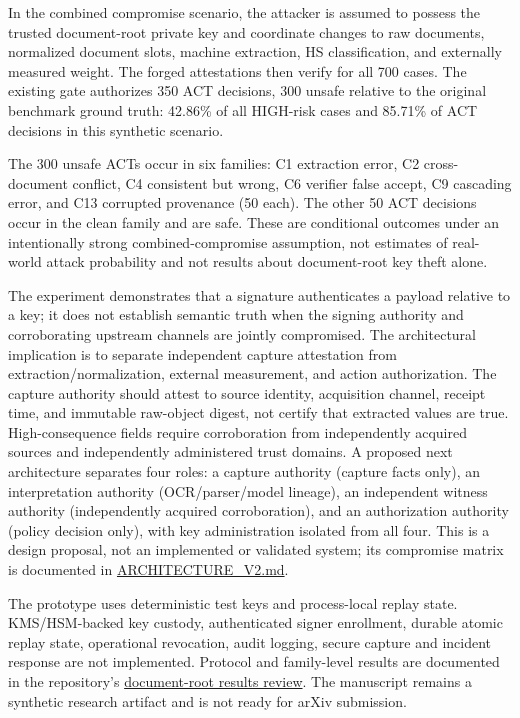 \documentclass[11pt]{article}
\begin{document}
In the combined compromise scenario, the attacker is assumed to possess the trusted document-root private key and coordinate changes to raw documents, normalized document slots, machine extraction, HS classification, and externally measured weight. The forged attestations then verify for all 700 cases. The existing gate authorizes 350 ACT decisions, 300 unsafe relative to the original benchmark ground truth: 42.86\% of all HIGH-risk cases and 85.71\% of ACT decisions in this synthetic scenario.

The 300 unsafe ACTs occur in six families: C1 extraction error, C2 cross-document conflict, C4 consistent but wrong, C6 verifier false accept, C9 cascading error, and C13 corrupted provenance (50 each). The other 50 ACT decisions occur in the clean family and are safe. These are conditional outcomes under an intentionally strong combined-compromise assumption, not estimates of real-world attack probability and not results about document-root key theft alone.

The experiment demonstrates that a signature authenticates a payload relative to a key; it does not establish semantic truth when the signing authority and corroborating upstream channels are jointly compromised. The architectural implication is to separate independent capture attestation from extraction/normalization, external measurement, and action authorization. The capture authority should attest to source identity, acquisition channel, receipt time, and immutable raw-object digest, not certify that extracted values are true. High-consequence fields require corroboration from independently acquired sources and independently administered trust domains. A proposed next architecture separates four roles: a capture authority (capture facts only), an interpretation authority (OCR/parser/model lineage), an independent witness authority (independently acquired corroboration), and an authorization authority (policy decision only), with key administration isolated from all four. This is a design proposal, not an implemented or validated system; its compromise matrix is documented in \href{https://github.com/Hafiz-IIT/EXIM-AI-Evidence-Gated-Autonomy/blob/main/experiments/document_root_attestation/ARCHITECTURE_V2.md}{ARCHITECTURE\_V2.md}.

The prototype uses deterministic test keys and process-local replay state. KMS/HSM-backed key custody, authenticated signer enrollment, durable atomic replay state, operational revocation, audit logging, secure capture and incident response are not implemented. Protocol and family-level results are documented in the repository's \href{https://github.com/Hafiz-IIT/EXIM-AI-Evidence-Gated-Autonomy/blob/main/experiments/document_root_attestation/RESULTS_REVIEW.md}{document-root results review}. The manuscript remains a synthetic research artifact and is not ready for arXiv submission.



\end{document}
